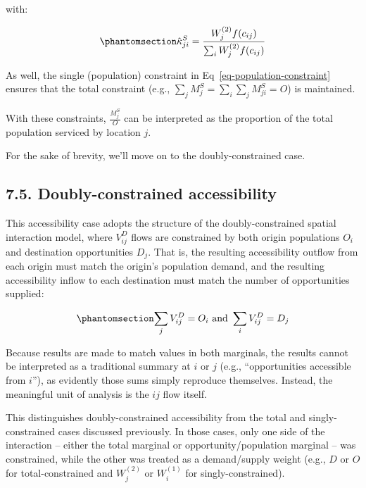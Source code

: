 \documentclass[
  10pt,
  letterpaper,
]{article}
\begin{document}
\noindent with:

\begin{equation}\phantomsection\label{eq-attraction-constrained-proportional-allocation-factor}{
\hat \kappa^S_{ji} = \frac{W_j^{(2)} f(c_{ij})}{\sum_i W_j^{(2)} f(c_{ij})}
}\end{equation}

As well, the single (population) constraint in
Eq~\ref{eq-population-constraint} ensures that the total constraint
(e.g., \(\sum_j M^S_{j} = \sum_i\sum_j  M^S_{ji} = O\)) is maintained.

With these constraints, \(\frac{M_j^S}{O}\) can be interpreted as the
proportion of the total population serviced by location \(j\).

For the sake of brevity, we'll move on to the doubly-constrained case.

\subsection{7.5. Doubly-constrained
accessibility}\label{doubly-constrained-accessibility}

This accessibility case adopts the structure of the doubly-constrained
spatial interaction model, where \(V_{ij}^D\) flows are constrained by
both origin populations \(O_i\) and destination opportunities \(D_j\).
That is, the resulting accessibility outflow from each origin must match
the origin's population demand, and the resulting accessibility inflow
to each destination must match the number of opportunities supplied:

\begin{equation}\phantomsection\label{eq-opportunity-population-equality-1}{
\sum_j V_{ij}^D = O_i \text{ and }  \sum_i V_{ij}^D =  D_j
}\end{equation}

Because results are made to match values in both marginals, the results
cannot be interpreted as a traditional summary at \(i\) or \(j\) (e.g.,
``opportunities accessible from \(i\)''), as evidently those sums simply
reproduce themselves. Instead, the meaningful unit of analysis is the
\(ij\) flow itself.

This distinguishes doubly-constrained accessibility from the total and
singly-constrained cases discussed previously. In those cases, only one
side of the interaction -- either the total marginal or
opportunity/population marginal -- was constrained, while the other was
treated as a demand/supply weight (e.g., \(D\) or \(O\) for
total-constrained and \(W_j^{(2)}\) or \(W_i^{(1)}\) for
singly-constrained).
\end{document}
